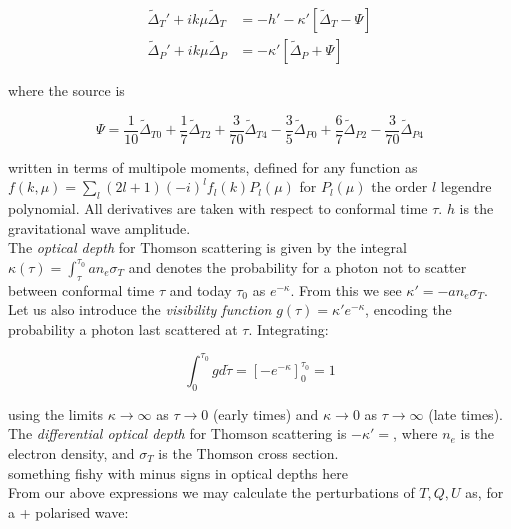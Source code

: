 \begin{equation}\begin{split}
\tilde{\Delta}_T'+ik\mu \tilde{\Delta}_T &= -h' -\kappa'[\tilde{\Delta}_T - \Psi]\\
\tilde{\Delta}_P'+ik\mu\tilde{\Delta}_P &= -\kappa'[\tilde{\Delta}_P + \Psi]
\end{split}
\label{Boltzmann}\end{equation}

where the source is

\begin{equation}
\Psi = \frac{1}{10}\tilde{\Delta}_{T0} + \frac{1}{7}\tilde{\Delta}_{T2} + \frac{3}{70}\tilde{\Delta}_{T4} - \frac{3}{5}\tilde{\Delta}_{P0} + \frac{6}{7}\tilde{\Delta}_{P2} - \frac{3}{70}\tilde{\Delta}_{P4}
\end{equation}


written in terms of multipole moments, defined for any function as $f(k, \mu) = \sum_l (2l+1)(-i)^lf_l(k)P_l(\mu)$ for $P_l(\mu)$ the order $l$ legendre polynomial. All derivatives are taken with respect to conformal time $\tau$. $h$ is the gravitational wave amplitude.\\

The \textit{optical depth} for Thomson scattering is given by the integral $\kappa(\tau) = \int_\tau^{\tau_0} an_e\sigma_T$ and denotes the probability for a photon not to scatter between conformal time $\tau$ and today $\tau_0$ as $e^{-\kappa}$. From this we see $\kappa'=-an_e\sigma_T$. Let us also introduce the \textit{visibility function} $g(\tau) = \kappa'e^{-\kappa}$, encoding the probability a photon last scattered at $\tau$. Integrating:

\begin{equation}
\int_0^{\tau_0} g d\tilde{\tau} = [-e^{-\kappa}]_0^{\tau_0} = 1
\end{equation}

using the limits $\kappa \rightarrow \infty$ as $\tau\rightarrow0$ (early times) and $\kappa \rightarrow 0$ as $\tau\rightarrow \infty$ (late times).\\




 The \textit{differential optical depth} for Thomson scattering is $-\kappa'=$, where $n_e$ is the electron density, and $\sigma_T$ is the Thomson cross section.  \\
something fishy with minus signs in optical depths here\\


From our above expressions we may calculate the perturbations of $T, Q, U$ as, for a + polarised wave:

